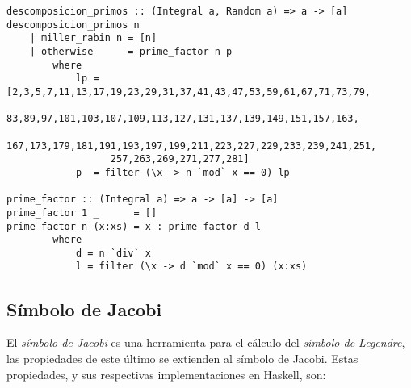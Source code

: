 \documentclass[10pt,spanish]{article}
\begin{document}
\begin{verbatim}
descomposicion_primos :: (Integral a, Random a) => a -> [a]
descomposicion_primos n 
    | miller_rabin n = [n]
    | otherwise      = prime_factor n p
        where
            lp = [2,3,5,7,11,13,17,19,23,29,31,37,41,43,47,53,59,61,67,71,73,79,
                  83,89,97,101,103,107,109,113,127,131,137,139,149,151,157,163,
                  167,173,179,181,191,193,197,199,211,223,227,229,233,239,241,251,
                  257,263,269,271,277,281]
            p  = filter (\x -> n `mod` x == 0) lp

prime_factor :: (Integral a) => a -> [a] -> [a]
prime_factor 1 _      = []
prime_factor n (x:xs) = x : prime_factor d l
        where
            d = n `div` x
            l = filter (\x -> d `mod` x == 0) (x:xs)
\end{verbatim}

\subsection{\textcolor{rojo}Símbolo de Jacobi}
El \textit{\textcolor{rojo}{símbolo de Jacobi}} es una herramienta para el cálculo del \textit{\textcolor{rojo}{símbolo de Legendre}}, las propiedades de este último se extienden al símbolo de Jacobi. Estas propiedades, y sus respectivas implementaciones en Haskell, son:
\end{document}
